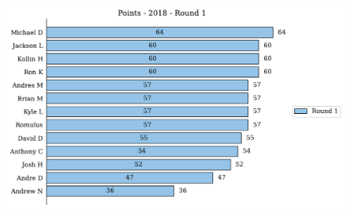 \documentclass[10pt]{article}
\begin{document}
\begin{minipage}[t]{13cm}
    \begin{figure}[H]
        \vspace{-3.5cm}
        \includegraphics[width=12cm]{../../figures/2018/Points-2018-Round1.pdf}
    \end{figure}
\end{minipage}
\end{document}
